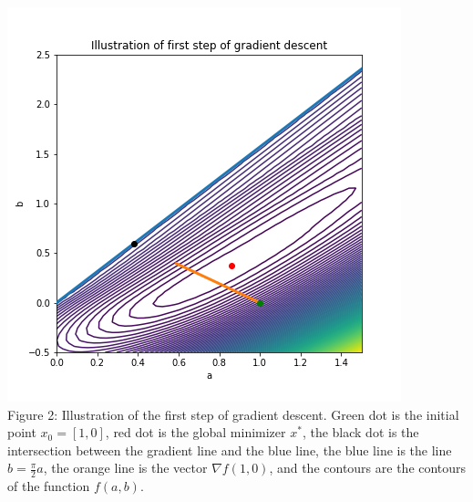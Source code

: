 \documentclass{letter}
\begin{document}
{    \begin{center}
        \includegraphics{../pics/gd_firststep.png} \\
        Figure 2: Illustration of the first step of gradient descent. Green dot is the initial point $x_0 = [1, 0]$, red dot is the global minimizer $x^*$, the black dot is the intersection between the gradient line and the blue line, the blue line is the line $b = \frac{\pi}{2}a$, the orange line is the vector $\nabla f(1, 0)$, and the contours are the contours of the function $f(a, b)$.
    \end{center}}
\end{document}
